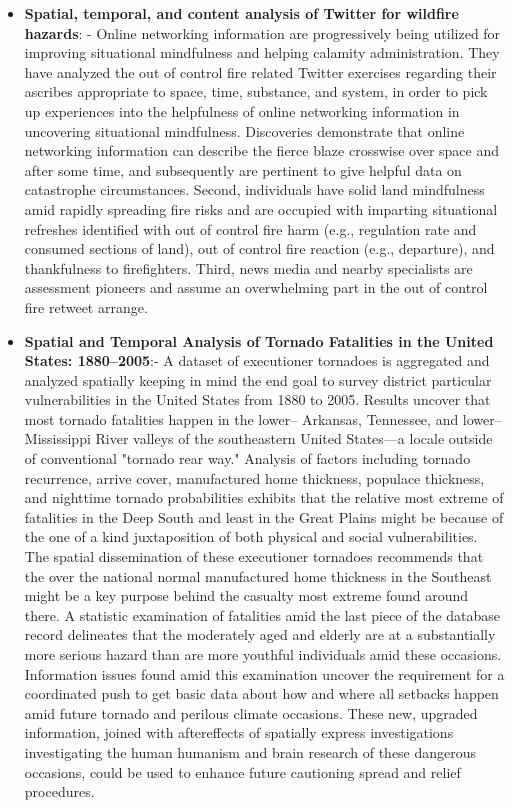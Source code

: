 \documentclass[12pt, oneside]{article}   	%
\begin{document}
\begin{itemize}
	\item \textbf{Spatial, temporal, and content analysis of Twitter for wildfire hazards}: -  Online networking information are progressively being utilized for improving situational mindfulness and helping calamity administration. They have analyzed the out of control fire related Twitter exercises regarding their ascribes appropriate to space, time, substance, and system, in order to pick up experiences into the helpfulness of online networking information in uncovering situational mindfulness. Discoveries demonstrate that online networking information can describe the fierce blaze crosswise over space and after some time, and subsequently are pertinent to give helpful data on catastrophe circumstances. Second, individuals have solid land mindfulness amid rapidly spreading fire risks and are occupied with imparting situational refreshes identified with out of control fire harm (e.g., regulation rate and consumed sections of land), out of control fire reaction (e.g., departure), and thankfulness to firefighters. Third, news media and nearby specialists are assessment pioneers and assume an overwhelming part in the out of control fire retweet arrange.
	\item \textbf{Spatial and Temporal Analysis of Tornado Fatalities in the United States: 1880–2005}:- A dataset of executioner tornadoes is aggregated and analyzed spatially keeping in mind the end goal to survey district particular vulnerabilities in the United States from 1880 to 2005. Results uncover that most tornado fatalities happen in the lower– Arkansas, Tennessee, and lower– Mississippi River valleys of the southeastern United States—a locale outside of conventional "tornado rear way." Analysis of factors including tornado recurrence, arrive cover, manufactured home thickness, populace thickness, and nighttime tornado probabilities exhibits that the relative most extreme of fatalities in the Deep South and least in the Great Plains might be because of the one of a kind juxtaposition of both physical and social vulnerabilities. The spatial dissemination of these executioner tornadoes recommends that the over the national normal manufactured home thickness in the Southeast might be a key purpose behind the casualty most extreme found around there. A statistic examination of fatalities amid the last piece of the database record delineates that the moderately aged and elderly are at a substantially more serious hazard than are more youthful individuals amid these occasions. Information issues found amid this examination uncover the requirement for a coordinated push to get basic data about how and where all setbacks happen amid future tornado and perilous climate occasions. These new, upgraded information, joined with aftereffects of spatially express investigations investigating the human humanism and brain research of these dangerous occasions, could be used to enhance future cautioning spread and relief procedures.
	
\end{itemize}	
\end{document}
